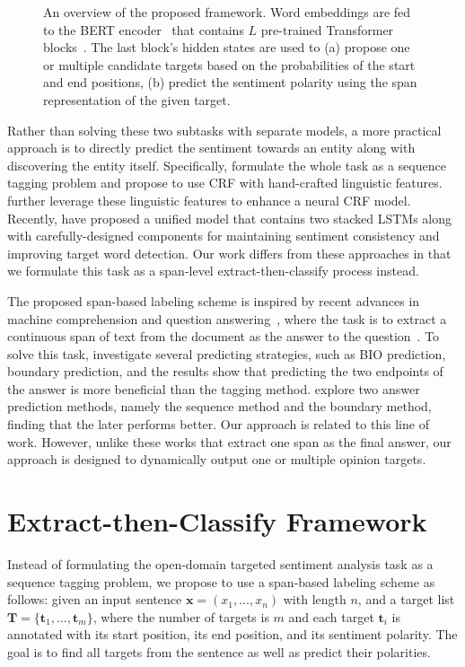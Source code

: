 \documentclass[11pt,a4paper]{article}
\begin{document}
\begin{figure*}
  \centering
  \hspace{0.5in}
\caption{An overview of the proposed framework. Word embeddings are fed to the BERT encoder~\cite{devlin2018bert} that contains $L$ pre-trained Transformer blocks~\cite{vaswani2017attention}. The last block's hidden states are used to (a) propose one or multiple candidate targets based on the probabilities of the start and end positions, (b) predict the sentiment polarity using the span representation of the given target.}
\label{fig:overview} \end{figure*}

Rather than solving these two subtasks with separate models, a more practical approach is to directly predict the sentiment towards an entity along with discovering the entity itself.
Specifically, \citet{mitchell2013open} formulate the whole task as a sequence tagging problem and propose to use CRF with hand-crafted linguistic features.
\citet{zhang2015neural} further leverage these linguistic features to enhance a neural CRF model.
Recently, \citet{li2018unified} have proposed a unified model that contains two stacked LSTMs along with carefully-designed components for maintaining sentiment consistency and improving target word detection.
Our work differs from these approaches in that we formulate this task as a span-level extract-then-classify process instead.

The proposed span-based labeling scheme is inspired by recent advances in machine comprehension and question answering~\cite{seo2016bidirectional,hu2017reinforced}, where the task is to extract a continuous span of text from the document as the answer to the question~\cite{Rajpurkar16}.
To solve this task, \citet{lee2016learning} investigate several predicting strategies, such as BIO prediction, boundary prediction, and the results show that predicting the two endpoints of the answer is more beneficial than the tagging method.
\citet{wang2016machine} explore two answer prediction methods, namely the sequence method and the boundary method, finding that the later performs better.
Our approach is related to this line of work. However, unlike these works that extract one span as the final answer, our approach is designed to dynamically output one or multiple opinion targets.
 \section{Extract-then-Classify Framework}
Instead of formulating the open-domain targeted sentiment analysis task as a sequence tagging problem, we propose to use a span-based labeling scheme as follows: 
given an input sentence $\mathbf{x}=(x_1, ..., x_n)$ with length $n$, and a target list $\mathbf{T}=\{\mathbf{t}_1, ..., \mathbf{t}_m\}$, where the number of targets is $m$ and each target $\mathbf{t}_i$ is annotated with its start position, its end position, and its sentiment polarity.
The goal is to find all targets from the sentence as well as predict their polarities.
\end{document}
